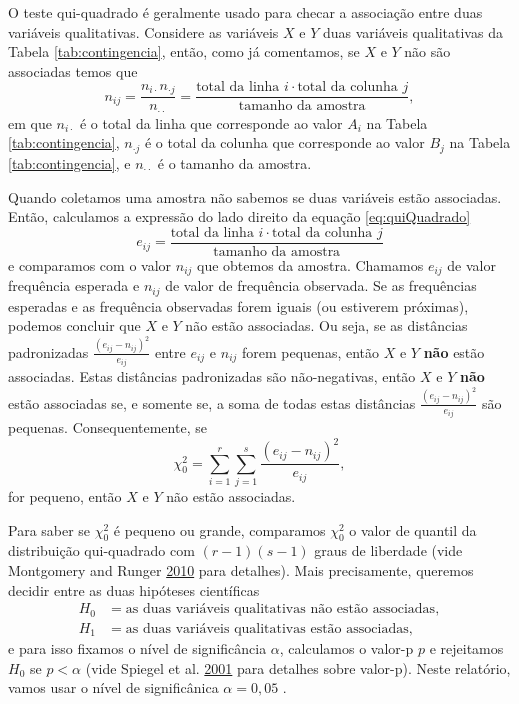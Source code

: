 \documentclass[]{article}
\begin{document}
O teste qui-quadrado é geralmente usado para checar a associação entre duas variáveis
qualitativas. Considere as variáveis \(X\) e \(Y\) duas variáveis qualitativas da
Tabela \ref{tab:contingencia}, então, como já comentamos, se \(X\) e \(Y\) não são associadas temos que
\begin{equation}
\label{eq:quiQuadrado}
n_{ij} = \frac{n_{i \cdot } n_{\cdot j}}{n_{\cdot \cdot}} = \frac{\mbox{total da linha }i \cdot \mbox{total da colunha }j}{\mbox{tamanho da amostra}},
\end{equation}
em que \(n_{i \cdot}\) é o total da linha que corresponde ao valor \(A_i\) na Tabela \ref{tab:contingencia}, \(n_{\cdot j}\) é o total da colunha que corresponde ao valor \(B_j\) na Tabela \ref{tab:contingencia}, e \(n_{\cdot \cdot}\) é o tamanho da amostra.

Quando coletamos uma amostra não sabemos se duas variáveis estão associadas. Então, calculamos a expressão do lado direito da equação \eqref{eq:quiQuadrado}
\[
e_{ij} = \frac{\mbox{total da linha }i \cdot \mbox{total da colunha }j}{\mbox{tamanho da amostra}}
\]
e comparamos com o valor \(n_{ij}\) que obtemos da amostra. Chamamos \(e_{ij}\) de valor frequência esperada e \(n_{ij}\) de valor de frequência observada. Se as frequências esperadas e as frequência observadas forem iguais (ou estiverem próximas), podemos concluir que \(X\) e \(Y\) não estão associadas. Ou seja, se as distâncias padronizadas \(\frac{(e_{ij} - n_{ij})^2}{e_{ij}}\) entre \(e_{ij}\) e \(n_{ij}\) forem pequenas, então \(X\) e \(Y\) \textbf{não} estão associadas. Estas distâncias padronizadas são não-negativas, então \(X\) e \(Y\) \textbf{não} estão associadas se, e somente se, a soma de todas estas distâncias \(\frac{(e_{ij} - n_{ij})^2}{e_{ij}}\) são pequenas. Consequentemente, se
\[
\chi_0^2 = \sum_{i=1}^{r} \sum_{j=1}^{s} \frac{(e_{ij} - n_{ij})^2}{e_{ij}},
\]
for pequeno, então \(X\) e \(Y\) não estão associadas.

Para saber se \(\chi_0^2\) é pequeno ou grande, comparamos \(\chi_0^2\) o valor de quantil da distribuição qui-quadrado com \((r-1)(s-1)\) graus de liberdade (vide Montgomery and Runger \protect\hyperlink{ref-montgomery2010applied}{2010} para detalhes). Mais precisamente, queremos decidir entre as duas hipóteses científicas
\begin{align*}
H_0 &= \mbox{as duas variáveis qualitativas não estão associadas},\\
H_1 &= \mbox{as duas variáveis qualitativas estão associadas},
\end{align*}
e para isso fixamos o nível de significância \(\alpha\), calculamos o valor-p \(p\) e rejeitamos \(H_0\) se \(p < \alpha\) (vide Spiegel et al. \protect\hyperlink{ref-spiegel2001probability}{2001} para detalhes sobre valor-p). Neste relatório, vamos usar o nível de significânica \(\alpha=0,05\) .
\end{document}

